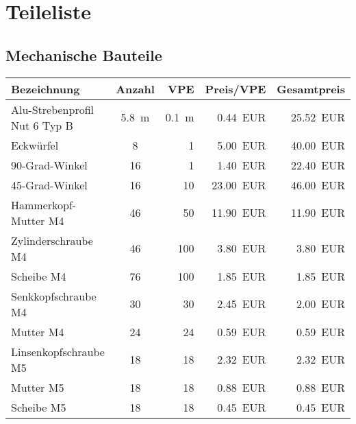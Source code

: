 \documentclass[./00PhotoBox.tex]{subfiles}
\begin{document}
\chapter{Teileliste}
\label{ch:teileliste}
\section{Mechanische Bauteile}


\begin{table}[ht]
    \centering
    \begin{tabular}{l|c|r|r|r}
        Bezeichnung                   & Anzahl           & \acrshort{VPE}   & Preis/\acrshort{VPE} & Gesamtpreis      \\
        \hline
        Alu-Strebenprofil Nut 6 Typ B & \SI{5,8}{\metre} & \SI{0,1}{\metre} & \SI{0,44}{EUR}       & \SI{25,52}{EUR}  \\
        Eckwürfel                     & 8                & 1                & \SI{5,00}{EUR}       & \SI{40,00}{EUR}  \\
        90-Grad-Winkel                & 16               & 1                & \SI{1,40}{EUR}       & \SI{22,40}{EUR}  \\
        45-Grad-Winkel                & 16               & 10               & \SI{23,00}{EUR}      & \SI{46,00}{EUR}  \\
        Hammerkopf-Mutter M4          & 46               & 50               & \SI{11,90}{EUR}      & \SI{11,90}{EUR}  \\
        Zylinderschraube M4           & 46               & 100              & \SI{3,80}{EUR}       & \SI{3,80}{EUR}   \\
        Scheibe M4                    & 76               & 100              & \SI{1,85}{EUR}       & \SI{1,85}{EUR}   \\
        Senkkopfschraube M4           & 30               & 30               & \SI{2,45}{EUR}       & \SI{2,00}{EUR}   \\
        Mutter M4                     & 24               & 24               & \SI{0,59}{EUR}       & \SI{0,59}{EUR}   \\
        Linsenkopfschraube M5         & 18               & 18               & \SI{2,32}{EUR}       & \SI{2,32}{EUR}   \\ %
        Mutter M5                     & 18               & 18               & \SI{0,88}{EUR}       & \SI{0,88}{EUR}   \\
        Scheibe M5                    & 18               & 18               & \SI{0,45}{EUR}       & \SI{0,45}{EUR}   \\

\end{tabular}
\end{table}
\end{document}
